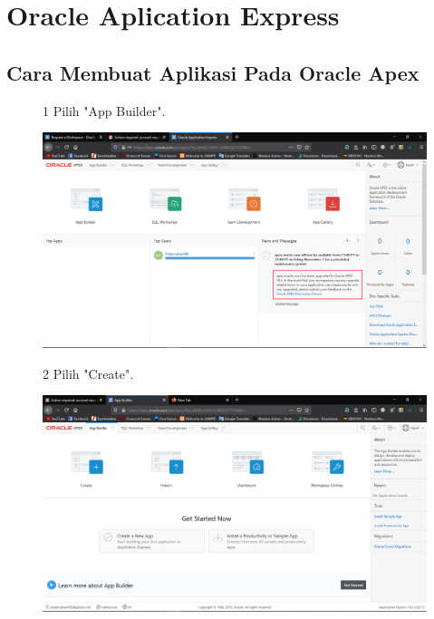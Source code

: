 \chapter{Oracle Aplication Express}

\section{Cara Membuat Aplikasi Pada Oracle Apex}

\begin{enumerate}





\begin{figure}[!htbp]
\item[1] Pilih "App Builder".
    \begin{center}
    \includegraphics[scale=0.3]{section/Screenshot(28).png}
    \end{center}
    \end{figure}
    
\begin{figure}[!htbp]
\item[2] Pilih "Create".
\begin{center}
    \includegraphics[scale=0.3]{section/Screenshot(29).png}
    \end{center}
    \end{figure}
    

\end{enumerate}

